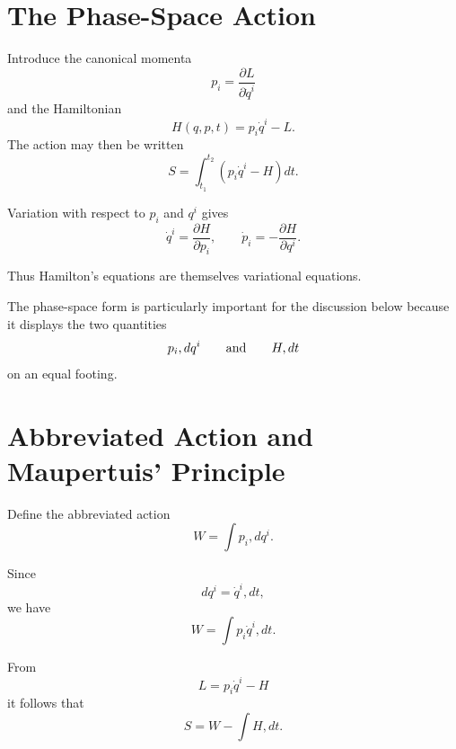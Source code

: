 \section{The Phase-Space Action}

Introduce the canonical momenta
\begin{equation}
p_i=
\frac{\partial L}{\partial\dot q^i}
\end{equation}
and the Hamiltonian
\begin{equation}
H(q,p,t)
=
p_i\dot q^i-L.
\end{equation}
The action may then be written
\begin{equation}
S
=
\int_{t_1}^{t_2}
\left(
p_i\dot q^i-H
\right)dt.
\label{eq:phase-space-action}
\end{equation}

Variation with respect to $p_i$ and $q^i$ gives
\begin{equation}
\dot q^i
=
\frac{\partial H}{\partial p_i},
\qquad
\dot p_i
=
-\frac{\partial H}{\partial q^i}.
\end{equation}

Thus Hamilton's equations are themselves variational equations.

The phase-space form is particularly important for the discussion below because it displays the two quantities
\begin{equation}
p_i,dq^i
\qquad\hbox{and}\qquad
H,dt
\end{equation}
on an equal footing.

\section{Abbreviated Action and Maupertuis' Principle}

Define the abbreviated action
\begin{equation}
\boxed{
W=\int p_i,dq^i.
}
\label{eq:abbreviated-action}
\end{equation}

Since
\begin{equation}
dq^i=\dot q^i,dt,
\end{equation}
we have
\begin{equation}
W
=
\int p_i\dot q^i,dt.
\end{equation}

From
\begin{equation}
L=p_i\dot q^i-H
\end{equation}
it follows that
\begin{equation}
\boxed{
S=W-\int H,dt.
}
\label{eq:S-W-H}
\end{equation}

